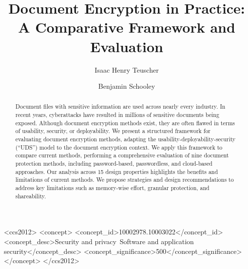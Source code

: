 \documentclass[sigconf]{acmart}
\begin{document}
\title{Document Encryption in Practice: A Comparative Framework and Evaluation}

\author{Isaac Henry Teuscher}

\author{Benjamin Schooley}

\begin{abstract}
Document files with sensitive information are used across nearly every industry. In recent years, cyberattacks have resulted in millions of sensitive documents being exposed. Although
document encryption methods exist, they are often flawed in terms of usability, security, or deployability. We present a structured framework for evaluating document encryption methods, adapting the usability-deployability-security (“UDS”) model to the document encryption context. We apply this framework to compare current methods, performing a comprehensive evaluation of nine document protection methods, including password-based, passwordless, and cloud-based approaches. Our analysis across 15 design properties highlights the benefits and limitations of current methods. We propose
strategies and design recommendations to address key limitations such as memory-wise effort, granular protection, and shareability.
\end{abstract}

\begin{CCSXML}
<ccs2012>
   <concept>
       <concept_id>10002978.10003022</concept_id>
       <concept_desc>Security and privacy~Software and application security</concept_desc>
       <concept_significance>500</concept_significance>
       </concept>
 </ccs2012>
\end{CCSXML}



\maketitle
\end{document}
